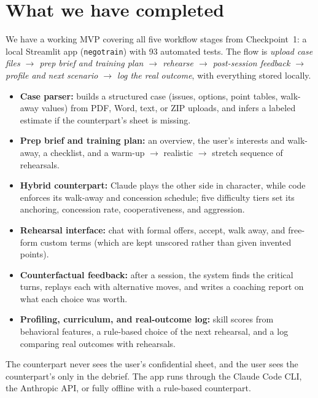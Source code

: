 \documentclass[10pt]{article}
\newcommand{\code}[1]{\texttt{#1}}
\begin{document}
\section{What we have completed}

We have a working MVP covering all five workflow stages from Checkpoint~1: a local
Streamlit app (\code{negotrain}) with 93 automated tests. The flow is \emph{upload case
files $\rightarrow$ prep brief and training plan $\rightarrow$ rehearse $\rightarrow$
post-session feedback $\rightarrow$ profile and next scenario $\rightarrow$ log the real
outcome}, with everything stored locally.
\begin{itemize}
  \item \textbf{Case parser:} builds a structured case (issues, options, point tables,
    walk-away values) from PDF, Word, text, or ZIP uploads, and infers a labeled estimate
    if the counterpart's sheet is missing.
  \item \textbf{Prep brief and training plan:} an overview, the user's interests and
    walk-away, a checklist, and a warm-up $\rightarrow$ realistic $\rightarrow$ stretch
    sequence of rehearsals.
  \item \textbf{Hybrid counterpart:} Claude plays the other side in character, while code
    enforces its walk-away and concession schedule; five difficulty tiers set its
    anchoring, concession rate, cooperativeness, and aggression.
  \item \textbf{Rehearsal interface:} chat with formal offers, accept, walk away, and
    free-form custom terms (which are kept unscored rather than given invented points).
  \item \textbf{Counterfactual feedback:} after a session, the system finds the critical
    turns, replays each with alternative moves, and writes a coaching report on what each
    choice was worth.
  \item \textbf{Profiling, curriculum, and real-outcome log:} skill scores from behavioral
    features, a rule-based choice of the next rehearsal, and a log comparing real outcomes
    with rehearsals.
\end{itemize}
The counterpart never sees the user's confidential sheet, and the user sees the
counterpart's only in the debrief. The app runs through the Claude Code CLI, the
Anthropic API, or fully offline with a rule-based counterpart.

\end{document}
